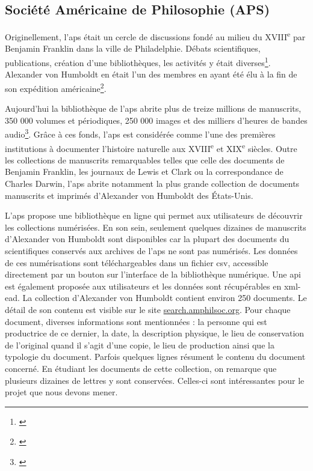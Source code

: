 \documentclass[a4paper, 12pt, twoside]{book}
\begin{document}
\subsection{Société Américaine de Philosophie (APS)}
\label{sub:APS}
Originellement, l'\gls{aps} était un cercle de discussions fondé au milieu du XVIII\textsuperscript{e} par Benjamin Franklin dans la ville de Philadelphie. Débats scientifiques, publications, création d'une bibliothèques, les activités y était diverses\footnote{\cite{noauthor_societe_2020}}. Alexander von Humboldt en était l'un des membres en ayant été élu à la fin de son expédition américaine\footnote{\cite{noauthor_alexander_2021}}. 

Aujourd'hui la bibliothèque de l'\gls{aps} abrite plus de treize millions de manuscrits, 350 000 volumes et périodiques, 250 000 images et des milliers d'heures de bandes audio\footnote{\cite{noauthor_aps_library}}. Grâce à ces fonds, l'\gls{aps} est considérée comme l'une des premières institutions à documenter l'histoire naturelle aux XVIII\textsuperscript{e} et XIX\textsuperscript{e} siècles. Outre les collections de manuscrits remarquables telles que celle des documents de Benjamin Franklin, les journaux de Lewis et Clark ou la correspondance de Charles Darwin, l'\gls{aps} abrite notamment la plus grande collection de documents manuscrits et imprimés d'Alexander von Humboldt des États-Unis.  

L'\gls{aps} propose une bibliothèque en ligne qui permet aux utilisateurs de découvrir les collections numérisées. En son sein, seulement quelques dizaines de manuscrits d'Alexander von Humboldt sont disponibles car la plupart des documents du scientifiques conservés aux archives de l'\gls{aps} ne sont pas numérisés. Les données de ces numérisations sont téléchargeables dans un fichier \gls{csv}, accessible directement par un bouton sur l'interface de la bibliothèque numérique. Une \gls{api} est également proposée aux utilisateurs et les données sont récupérables en \gls{xml}-\gls{ead}. La collection d'Alexander von Humboldt contient environ 250 documents. Le détail de son contenu est visible sur le site \href{https://search.amphilsoc.org/collections/view?docId=ead/Mss.B.H88-ead.xml;query=Alexander\%20von\%20Humboldt}{search.amphilsoc.org}. Pour chaque document, diverses informations sont mentionnées : la personne qui est productrice de ce dernier, la date, la description physique, le lieu de conservation de l'original quand il s'agit d'une copie, le lieu de production ainsi que la typologie du document. Parfois quelques lignes résument le contenu du document concerné. En étudiant les documents de cette collection, on remarque que plusieurs dizaines de lettres y sont conservées. Celles-ci sont intéressantes pour le projet que nous devons mener. 
\end{document}
